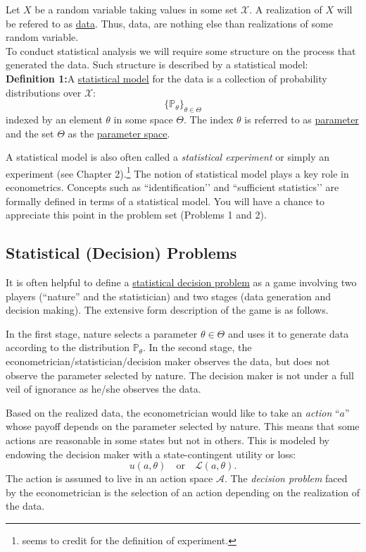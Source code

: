 \documentclass[11pt]{article} %
\begin{document}
Let $X$ be a random variable taking values in some set $\mathcal{X}$. A realization of $X$ will be refered to as \underline{data}. Thus, data, are nothing else than realizations of some random variable. \\

To conduct statistical analysis we will require some structure on the process that generated the data. Such structure is described by a statistical model:\\ 

\noindent \textbf{Definition 1:}A \underline{statistical model} for the data is a collection of probability distributions over $\mathcal{X}$:
\[ \{\mathbb{P}_{\theta}\}_{\theta \in \Theta} \]
 indexed by an element $\theta$ in some space $\Theta$. The index $\theta$ is referred to as \underline{parameter} and the set $\Theta$ as the \underline{parameter space}.  
 
 A statistical model is also often called a \emph{statistical experiment} or simply an experiment (see \cite{leCam2000} Chapter 2).\footnote{\cite{leCam2000} seems to credit \cite{Blackwell1953} for the definition of experiment.} The notion of statistical model plays a key role in econometrics. Concepts such as ``identification’’ and ``sufficient statistics’’ are formally defined in terms of a statistical model. You will have a chance to appreciate this point in the problem set (Problems 1 and 2).  

\subsection{Statistical (Decision) Problems}

It is often helpful to define a \underline{statistical decision problem} as a game involving two players (``nature'' and the statistician) and two stages (data generation and decision making).  The extensive form description of the game is as follows. 

In the first stage, nature selects a parameter $\theta \in \Theta$ and uses it to generate data according to the distribution $\mathbb{P}_{\theta}$. In the second stage, the econometrician/statistician/decision maker observes the data, but does not observe the parameter selected by nature. The decision maker is not under a full veil of ignorance as he/she observes the data. 

 Based on the realized data, the econometrician would like to take an \emph{action} ``$a$'' whose payoff depends on the parameter selected by nature. This means that some actions are reasonable in some states but not in others. This is modeled by endowing the decision maker with a state-contingent utility or loss:
$$u(a,\theta) \quad \text{or} \quad \mathcal{L}(a,\theta).$$
The action is assumed to live in an action space $\mathcal{A}$. The \emph{decision problem} faced by the econometrician is the selection of an action depending on the realization of the data. 
\end{document}
